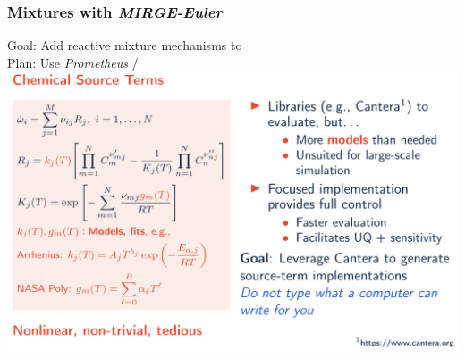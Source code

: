 \begin{frame}\frametitle{Mixtures with \textit{MIRGE-Euler}}
  \begin{center}
  Goal: Add reactive mixture mechanisms to \mirgecom{}\\
  Plan: Use \textit{Prometheus} / \pyrometheus\\
  \includegraphics[width=.8\textwidth]{figures/mtc/Prometheus1.png}
  \\
  \end{center}
\end{frame}

